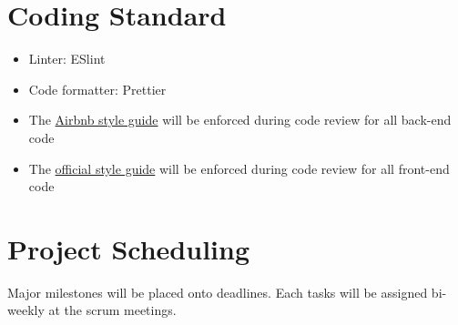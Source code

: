 \documentclass{article}
\begin{document}
\section{Coding Standard}

\begin{itemize}
    \item Linter: ESlint
    \item Code formatter: Prettier
    \item The \href{https://github.com/airbnb/javascript}{Airbnb style guide} will be enforced during code review for all back-end code
    \item The \href{https://angular.io/guide/styleguide}{official style guide} will be enforced during code review for all front-end code
\end{itemize}

\section{Project Scheduling}

Major milestones will be placed onto deadlines. Each tasks will be assigned bi-weekly at the scrum meetings.
\end{document}
